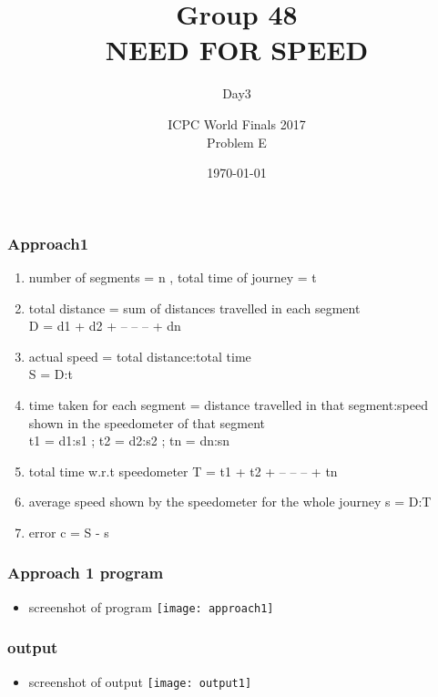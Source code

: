 \documentclass{beamer}
\title{Group 48 \\ NEED FOR SPEED}
\subtitle{Day3}
\date{\today}
\author{ICPC World Finals 2017 \\ Problem E}
\begin{document}
    \begin{frame}
            \titlepage
    \end{frame}
    
    \begin{frame}
            \frametitle{Approach1}
            \begin{enumerate}
   		    \item number of segments = n , total time of journey = t
		    \item total distance = sum of distances travelled in each segment\\D = d1 + d2 + -- -- -- + dn
		    \item actual speed = total distance:total time\\S = D:t
		    \item time taken for each segment = distance travelled in that segment:speed shown in the speedometer of that segment\\t1 = d1:s1 ; t2 = d2:s2 ; tn = dn:sn											    \item total time w.r.t speedometer T = t1 + t2 + -- -- -- + tn
		    \item average speed shown by the speedometer for the whole journey s = D:T 			                            \item error c = S - s
	    \end{enumerate}
    \end{frame}

    \begin{frame}
            \frametitle{Approach 1 program}
            \begin{itemize}
		    \item screenshot of program
			    \texttt{[image: approach1]}
            \end{itemize}
    \end{frame}
	    
    \begin{frame}
	\frametitle{output}
	\begin{itemize}
		\item screenshot of output
			\texttt{[image: output1]}
	\end{itemize}
    \end{frame}
\end{document}
